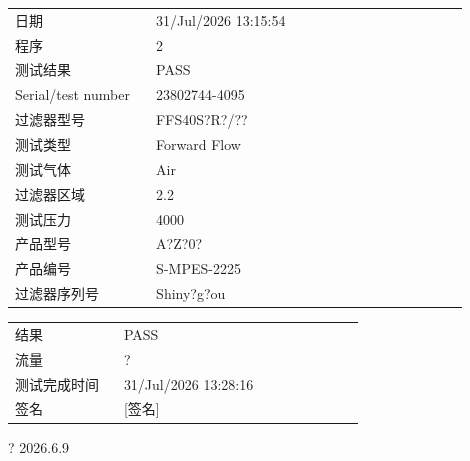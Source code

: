 \documentclass[UTF8,10pt,a4paper,fontset=fandol]{ctexart}
\newcommand{\fieldvalue}[1]{#1}
\newcommand{\handwritten}[1]{#1}
\begin{document}
\begin{tabular}{@{}p{0.28\linewidth}p{0.62\linewidth}@{}}
日期 &
\fieldvalue{31/Jul/2026 13:15:54}
\\
程序 &
\fieldvalue{2}
\\
测试结果 &
\fieldvalue{PASS}
\\
Serial/test number &
\fieldvalue{23802744-4095}
\\
过滤器型号 &
\fieldvalue{FFS40S?R?/??}
\\
测试类型 &
\fieldvalue{Forward Flow}
\\
测试气体 &
\fieldvalue{Air}
\\
过滤器区域 &
\fieldvalue{2.2}
\\
测试压力 &
\fieldvalue{4000}
\\
产品型号 &
\fieldvalue{A?Z?0?}
\\
产品编号 &
\fieldvalue{S-MPES-2225}
\\
过滤器序列号 &
\fieldvalue{Shiny?g?ou}
\\
\end{tabular}

\begin{tabular}{@{}p{0.28\linewidth}p{0.62\linewidth}@{}}
结果 &
\fieldvalue{PASS}
\\
流量 &
\fieldvalue{?}
\\
测试完成时间 &
\fieldvalue{31/Jul/2026 13:28:16}
\\
签名 &
\fieldvalue{\handwritten{[签名]}}
\\
\end{tabular}

\handwritten{? 2026.6.9}
\end{document}

